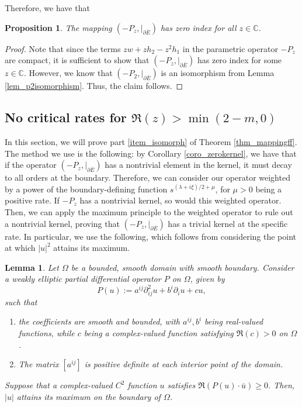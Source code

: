 \documentclass[10pt, a4paper]{article}
\theoremstyle{plain}%
\newtheorem{lem}[theorem]{Lemma}
\newtheorem{prop}[theorem]{Proposition}
\theoremstyle{definition}
\numberwithin{figure}{section}
\numberwithin{equation}{section}
\newcommand{\bC}{\mathbb{C}}
\newcommand{\pa}{\partial}
\newcommand{\oE}{{\overline{E}}}
\newcommand{\bu}{\bar{u}}
\begin{document}
Therefore, we have that 
\begin{prop}\label{prop_zeroindex}
	The mapping $(-P_z,|_{\pa\oE})$ has zero index for all $z\in\bC$.
\end{prop}
\begin{proof}
	Note that since the terms $zw+zh_2-z^2h_1$ in the parametric operator $-P_z$ are compact, it is sufficient to show that $(-P_z,|_{\pa\oE})$ has zero index for some $z\in \bC$. However, we know that $(-P_2,|_{\pa\oE})$ is an isomorphism from Lemma \ref{lem_p2isomorphism}. Thus, the claim follows.
\end{proof}



\subsection{No critical rates for $\Re(z)>\min(2-m,0)$}

In this section, we will prove part \ref{item_isomorph} of Theorem \ref{thm_mappingff}. The method we use is the following: by Corollary \ref{coro_zerokernel}, we have that if the operator $(-P_z,|_{\pa\oE})$ has a nontrivial element in the kernel, it must decay to all orders at the boundary. Therefore, we can consider our operator weighted by a power of the boundary-defining function $s^{(\lambda+i\xi)/2+\mu}$, for $\mu>0$ being a positive rate. If $-P_z$ has a nontrivial kernel, so would this weighted operator. Then, we can apply the maximum principle to the weighted operator to rule out a nontrivial kernel, proving that $(-P_z,|_{\pa\oE})$ has a trivial kernel at the specific rate. In particular, we use the following, which follows from considering the point at which $|u|^2$ attains its maximum.

\begin{lem}\label{lem_maximumprinciple}
	Let $\Omega$ be a bounded, smooth domain with smooth boundary. Consider a weakly elliptic partial differential operator $P$ on $\Omega$, given by  \[
	P(u):= a^{ij}\pa^2_{ij}u+b^i\pa_iu + cu,
	\]
	such that 
	\begin{enumerate} 
		\item the coefficients are smooth and bounded, with $a^{ij},b^i$ being real-valued functions, while $c$ being a complex-valued function satisfying $\Re(c)>0$ on $\Omega$. 
		\item The matrix $[a^{ij}]$ is positive definite at each interior point of the domain.
	\end{enumerate}
	Suppose that a complex-valued $C^{2}$ function $u$ satisfies $\Re(P(u)\cdot \bu)\geq 0$. Then, $|u|$ attains its maximum on the boundary of $\Omega$.
\end{lem}
\end{document}
